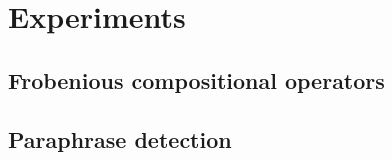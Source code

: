 
\section{Experiments}
\label{cha:extr-exper}


\subsection{Frobenious compositional operators}
\label{sec:frob-comp-oper}

\subsection{Paraphrase detection}
\label{sec:paraphrase-detection}




